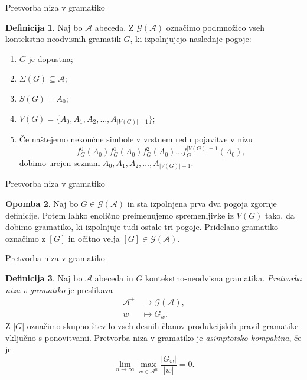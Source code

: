 \documentclass{beamer}
\newcommand{\G}{\mathcal{G}}
\newcommand{\A}{\mathcal{A}}
\theoremstyle{definition} %
\newtheorem{definicija}{Definicija}[section]
\newtheorem{opomba}[definicija]{Opomba}
\begin{document}
\begin{frame}{Pretvorba niza v gramatiko}
    \begin{definicija}
        Naj bo $\A$ abeceda. Z $ \G(\A) $ označimo podmnožico vseh kontekstno neodvisnih gramatik
        $G$, ki izpolnjujejo naslednje pogoje:
        \begin{enumerate}
            \item<1-> $G$ je dopustna;
            \item<2-> $ \Sigma(G) \subseteq \A $;
            \item<3->$ S(G) = A_0 $;
            \item<4-> $ V(G) = \{ A_0, A_1, A_2, \ldots, A_{|V(G)| - 1} \} $;
            \item<5-> Če naštejemo nekončne simbole v vrstnem redu pojavitve v nizu
            \[
            f_G^0(A_0) f_G^1(A_0) f_G^2(A_0) \dots f_G^{|V(G)| - 1}(A_0),
            \]
            dobimo urejen seznam $ A_0, A_1, A_2, \ldots, A_{|V(G)| - 1} $.
        \end{enumerate}
    \end{definicija}
\end{frame}

\begin{frame}{Pretvorba niza v gramatiko}
    \begin{opomba}
         Naj bo $ G \in \G(\A) $ in sta izpolnjena prva dva pogoja zgornje definicije.
         Potem lahko enolično preimenujemo spremenljivke iz $ V(G) $ tako, da dobimo gramatiko, ki izpolnjuje tudi ostale tri pogoje. Pridelano gramatiko označimo z $[G]$ in očitno velja $ [G] \in \G(\A) $.
    \end{opomba}
\end{frame}

\begin{frame}{Pretvorba niza v gramatiko}
    \begin{definicija}
        Naj bo $\A$ abeceda in $G$ kontekstno-neodvisna gramatika. 
        \textit{Pretvorba niza v gramatiko} je preslikava
        \begin{align*}
            \A^+ &\rightarrow \G(\A), \\
            w &\mapsto G_w.
        \end{align*}
        \pause
        Z $|G|$ označimo skupno število vseh desnih članov produkcijskih pravil gramatike vključno s ponovitvami. Pretvorba niza v gramatiko je \textit{asimptotsko kompaktna}, če je
        \[
            \lim_{n \rightarrow \infty} \max_{w \in \A^n} \frac{|G_w|}{|w|} = 0.
        \]
    \end{definicija}
\end{frame}
\end{document}
